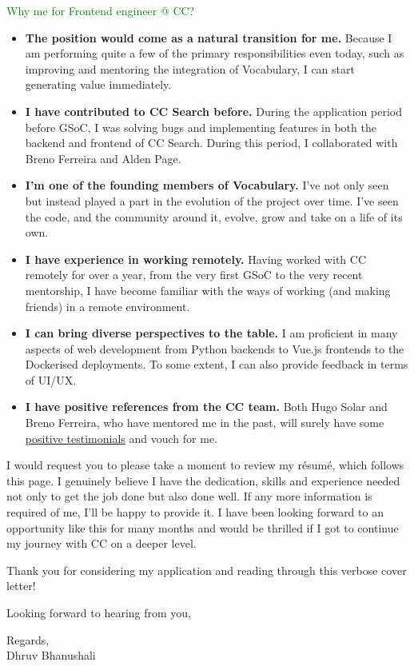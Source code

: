 \textcolor{green}{Why me for Frontend engineer @ CC?}
\raggedright\begin{itemize}[nosep, parsep=1mm, leftmargin=*]
  \item \textbf{The position would come as a natural transition for me.} Because
  I am performing quite a few of the primary responsibilities even today, such
  as improving and mentoring the integration of Vocabulary, I can start
  generating value immediately.

  \item \textbf{I have contributed to CC Search before.} During the application
  period before GSoC, I was solving bugs and implementing features in both the
  backend and frontend of CC Search. During this period, I collaborated with
  Breno Ferreira and Alden Page.

  \item \textbf{I'm one of the founding members of Vocabulary.} I've not only
  seen but instead played a part in the evolution of the project over time. I've
  seen the code, and the community around it, evolve, grow and take on a life of
  its own.

  \item \textbf{I have experience in working remotely.} Having worked with CC
  remotely for over a year, from the very first GSoC to the very recent
  mentorship, I have become familiar with the ways of working (and making
  friends) in a remote environment.

  \item \textbf{I can bring diverse perspectives to the table.} I am proficient
  in many aspects of web development from Python backends to Vue.js frontends to
  the Dockerised deployments. To some extent, I can also provide feedback in
  terms of UI/UX.

  \item \textbf{I have positive references from the CC team.} Both Hugo Solar
  and Breno Ferreira, who have mentored me in the past, will surely have some
  \href{https://www.linkedin.com/in/dhruvkb/}{positive testimonials} and vouch
  for me.
\end{itemize}

I would request you to please take a moment to review my résumé, which follows
this page. I genuinely believe I have the dedication, skills and experience
needed not only to get the job done but also done well. If any more information
is required of me, I'll be happy to provide it. I have been looking forward to
an opportunity like this for many months and would be thrilled if I got to
continue my journey with CC on a deeper level.

Thank you for considering my application and reading through this verbose cover
letter!

Looking forward to hearing from you,

Regards,\\
Dhruv Bhanushali
\setlength{\parskip}{0cm} %

\pagebreak